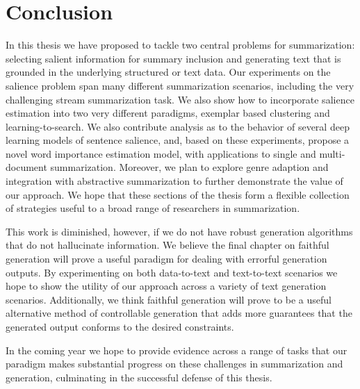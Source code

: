 \section{Conclusion}

In this thesis we have proposed to tackle two central problems for 
summarization: selecting salient information for summary inclusion and
generating text that is grounded in the underlying structured or text data. 
Our experiments on the salience problem span many different summarization
scenarios, including the very challenging stream summarization task.
We also show how to incorporate salience estimation into two very different
paradigms, exemplar based clustering and learning-to-search.
We also contribute analysis as to the behavior of several deep learning models
of sentence salience, and,  based on these experiments, propose a novel
word importance estimation model, with applications to single and 
multi-document summarization. Moreover, we plan to explore genre 
adaption and integration with abstractive summarization to further 
demonstrate the value of our approach.
We hope that these sections of the thesis
form a flexible collection of strategies useful to a broad range of 
researchers in summarization. 

This work is diminished, however,
if we do not
have robust generation algorithms that do not hallucinate information.
We believe the final chapter on faithful generation will prove a useful 
paradigm for dealing with errorful generation outputs. By experimenting
on both data-to-text and text-to-text scenarios we hope to show the 
utility of our approach across a variety of text generation scenarios. Additionally, we think faithful generation will
prove to be a useful
alternative method of controllable generation that adds more guarantees
that the generated output conforms to the desired constraints.

In the coming year we hope to provide evidence across a range
of tasks that our paradigm makes substantial progress on these
challenges in summarization and generation, culminating in the successful
defense of this thesis.

